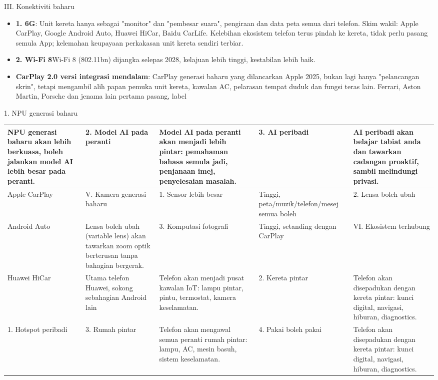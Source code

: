 


III. Konektiviti baharu

\begin{itemize}
  \item \textbf{1. 6G}: Unit kereta hanya sebagai "monitor" dan "pembesar suara", pengiraan dan data peta semua dari telefon. Skim wakil: Apple CarPlay, Google Android Auto, Huawei HiCar, Baidu CarLife. Kelebihan ekosistem telefon terus pindah ke kereta, tidak perlu pasang semula App; kelemahan keupayaan perkakasan unit kereta sendiri terbiar.
  \item \textbf{2. Wi-Fi 8}Wi-Fi 8 (802.11bn) dijangka selepas 2028, kelajuan lebih tinggi, kestabilan lebih baik.
  \item \textbf{CarPlay 2.0 versi integrasi mendalam}: CarPlay generasi baharu yang dilancarkan Apple 2025, bukan lagi hanya "pelancangan skrin", tetapi mengambil alih papan pemuka unit kereta, kawalan AC, pelarasan tempat duduk dan fungsi teras lain. Ferrari, Aston Martin, Porsche dan jenama lain pertama pasang, label
\end{itemize}


1. NPU generasi baharu

\begin{center}
\begin{tabularx}{\linewidth}{|X|X|X|X|X|}
\hline
\textbf{NPU generasi baharu akan lebih berkuasa, boleh jalankan model AI lebih besar pada peranti.} & \textbf{2. Model AI pada peranti} & \textbf{Model AI pada peranti akan menjadi lebih pintar: pemahaman bahasa semula jadi, penjanaan imej, penyelesaian masalah.} & \textbf{3. AI peribadi} & \textbf{AI peribadi akan belajar tabiat anda dan tawarkan cadangan proaktif, sambil melindungi privasi.} \tabularnewline
\hline
Apple CarPlay & V. Kamera generasi baharu & 1. Sensor lebih besar & Tinggi, peta/muzik/telefon/mesej semua boleh & 2. Lensa boleh ubah \tabularnewline
Android Auto & Lensa boleh ubah (variable lens) akan tawarkan zoom optik berterusan tanpa bahagian bergerak. & 3. Komputasi fotografi & Tinggi, setanding dengan CarPlay & VI. Ekosistem terhubung \tabularnewline
Huawei HiCar & Utama telefon Huawei, sokong sebahagian Android lain & Telefon akan menjadi pusat kawalan IoT: lampu pintar, pintu, termostat, kamera keselamatan. & 2. Kereta pintar & Telefon akan disepadukan dengan kereta pintar: kunci digital, navigasi, hiburan, diagnostics. \tabularnewline
1. Hotspot peribadi & 3. Rumah pintar & Telefon akan mengawal semua peranti rumah pintar: lampu, AC, mesin basuh, sistem keselamatan. & 4. Pakai boleh pakai & Telefon akan disepadukan dengan kereta pintar: kunci digital, navigasi, hiburan, diagnostics. \tabularnewline
\hline
\end{tabularx}
\end{center}

